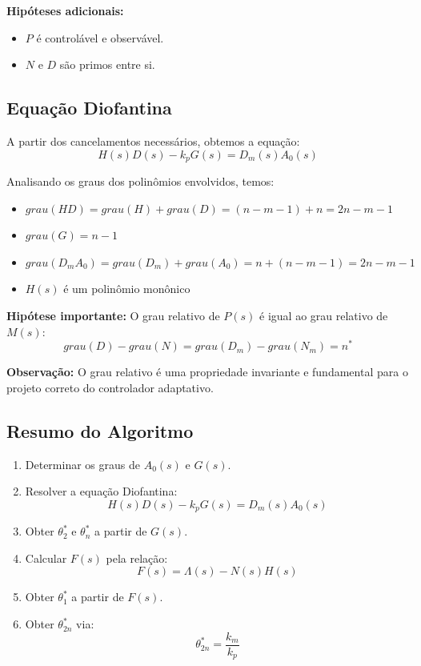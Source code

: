 \documentclass[10pt]{article}
\begin{document}
\textbf{Hipóteses adicionais:}
\begin{itemize}
    \item $P$ é controlável e observável.
    \item $N$ e $D$ são primos entre si.
\end{itemize}

\subsection{Equação Diofantina}

A partir dos cancelamentos necessários, obtemos a equação:
\[
H(s)D(s) - k_p G(s) = D_m(s) A_0(s)
\]

Analisando os graus dos polinômios envolvidos, temos:

\begin{itemize}
    \item $grau(HD) = grau(H) + grau(D) = (n - m - 1) + n = 2n - m - 1$
    \item $grau(G) = n - 1$
    \item $grau(D_m A_0) = grau(D_m) + grau(A_0) = n + (n - m - 1) = 2n - m - 1$
    \item $H(s)$ é um polinômio monônico
\end{itemize}

\textbf{Hipótese importante:} O grau relativo de $P(s)$ é igual ao grau relativo de $M(s)$:
\[
grau(D) - grau(N) = grau(D_m) - grau(N_m) = n^*
\]

\noindent
\textbf{Observação:} O grau relativo é uma propriedade invariante e fundamental para o projeto correto do controlador adaptativo.

\subsection{Resumo do Algoritmo}

\begin{enumerate}
    \item Determinar os graus de $A_0(s)$ e $G(s)$.
    \item Resolver a equação Diofantina: 
    \[
    H(s)D(s) - k_p G(s) = D_m(s)A_0(s)
    \]
    \item Obter $\theta_2^*$ e $\theta_n^*$ a partir de $G(s)$.
    \item Calcular $F(s)$ pela relação: 
    \[
    F(s) = \Lambda(s) - N(s)H(s)
    \]
    \item Obter $\theta_1^*$ a partir de $F(s)$.
    \item Obter $\theta_{2n}^*$ via: 
    \[
    \theta_{2n}^* = \frac{k_m}{k_p}
    \]
\end{enumerate}
\end{document}
